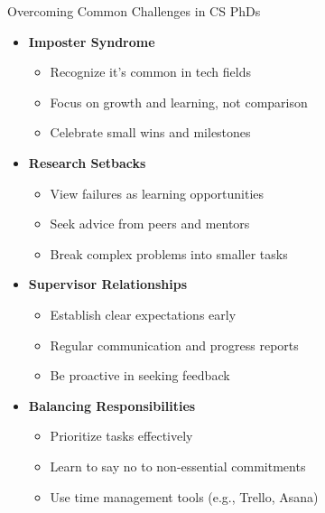 \documentclass[aspectratio=169,10pt]{beamer}
\begin{document}
\begin{frame}{Overcoming Common Challenges in CS PhDs}
\begin{itemize}
    \item \textbf{Imposter Syndrome}
    \begin{itemize}
        \item Recognize it's common in tech fields
        \item Focus on growth and learning, not comparison
        \item Celebrate small wins and milestones
    \end{itemize}
    \item \textbf{Research Setbacks}
    \begin{itemize}
        \item View failures as learning opportunities
        \item Seek advice from peers and mentors
        \item Break complex problems into smaller tasks
    \end{itemize}
    \item \textbf{Supervisor Relationships}
    \begin{itemize}
        \item Establish clear expectations early
        \item Regular communication and progress reports
        \item Be proactive in seeking feedback
    \end{itemize}
    \item \textbf{Balancing Responsibilities}
    \begin{itemize}
        \item Prioritize tasks effectively
        \item Learn to say no to non-essential commitments
        \item Use time management tools (e.g., Trello, Asana)
    \end{itemize}
\end{itemize}
\end{frame}
\end{document}
